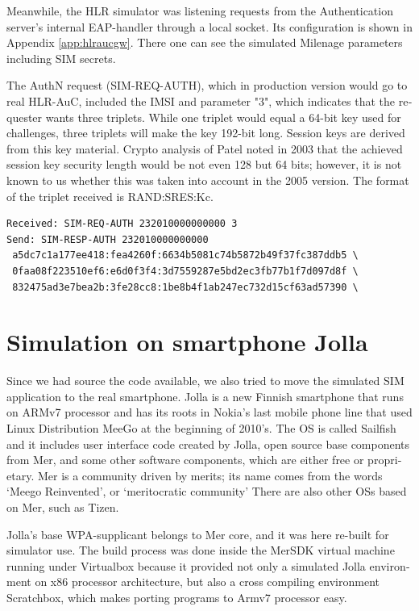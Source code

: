 \documentclass[12pt,a4paper,english]{tutthesis}
\begin{document}
\begin{otherlanguage}{english}
Meanwhile, the HLR simulator was listening requests from the Authentication
server's internal EAP-handler through a local socket. 
Its configuration is shown in
Appendix \ref{app:hlraucgw}. There one can see the simulated Milenage parameters including SIM secrets.



The AuthN request (SIM-REQ-AUTH), which in production version would go
to real HLR-AuC, included the IMSI and parameter "3", which indicates
that the requester wants three triplets.  
While one triplet would equal a 64-bit key used for challenges, three
triplets will make the key 192-bit long. Session keys are derived from
this key material. Crypto analysis of Patel \cite{patel-sim} noted in
2003 that the achieved session key security length would be not  even 128
but 64 bits; however,  it is not known to us whether this was taken into
account in the 2005 version. The 
format of the triplet received is RAND:SRES:Kc.

\footnotesize
\begin{verbatim}
Received: SIM-REQ-AUTH 232010000000000 3
Send: SIM-RESP-AUTH 232010000000000 
 a5dc7c1a177ee418:fea4260f:6634b5081c74b5872b49f37fc387ddb5 \
 0faa08f223510ef6:e6d0f3f4:3d7559287e5bd2ec3fb77b1f7d097d8f \
 832475ad3e7bea2b:3fe28cc8:1be8b4f1ab247ec732d15cf63ad57390 \
\end{verbatim}
\normalsize


\section{Simulation on smartphone Jolla}
\label{sec-5-3}

Since we had source the code available, we also tried to move the
simulated SIM application to the real smartphone.  Jolla is a new
Finnish smartphone that runs on ARMv7 processor and has its roots in
Nokia's last mobile phone line that used Linux Distribution MeeGo at
the beginning of 2010's.  The OS is called Sailfish and it includes user
interface code created by Jolla, open source base components from Mer, and
some other software components, which are either free or proprietary.
Mer is a community driven by merits; its name comes from the words 
`Meego Reinvented', or `meritocratic community'
There are also other OSs based on Mer, such as Tizen.

Jolla's base
WPA-supplicant belongs to Mer core, and it was here re-built for
simulator use. The build process was done inside the MerSDK virtual
machine running under Virtualbox because it provided not only
a simulated Jolla environment on x86 processor architecture, but also a cross
compiling environment Scratchbox, which makes porting programs to Armv7
processor easy.


\end{otherlanguage}
\end{document}
